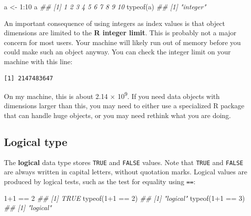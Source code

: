 \documentclass[
  13,
  letterpaper,
]{report}
\newenvironment{Shaded}{\begin{snugshade}}{\end{snugshade}}
\newcommand{\DecValTok}[1]{\textcolor[rgb]{0.68,0.00,0.00}{#1}}
\newcommand{\DocumentationTok}[1]{\textcolor[rgb]{0.37,0.37,0.37}{\textit{#1}}}
\newcommand{\FunctionTok}[1]{\textcolor[rgb]{0.28,0.35,0.67}{#1}}
\newcommand{\NormalTok}[1]{\textcolor[rgb]{0.00,0.23,0.31}{#1}}
\newcommand{\OtherTok}[1]{\textcolor[rgb]{0.00,0.23,0.31}{#1}}
\newcommand{\SpecialCharTok}[1]{\textcolor[rgb]{0.37,0.37,0.37}{#1}}
\begin{document}
\begin{Shaded}
\begin{Highlighting}[]
\NormalTok{a }\OtherTok{\textless{}{-}} \DecValTok{1}\SpecialCharTok{:}\DecValTok{10}
\NormalTok{a}
\DocumentationTok{\#\#  [1]  1  2  3  4  5  6  7  8  9 10}
\FunctionTok{typeof}\NormalTok{(a)}
\DocumentationTok{\#\# [1] "integer"}
\end{Highlighting}
\end{Shaded}

An important consequence of using integers as index values is that
object dimensions are limited to the \textbf{R integer limit}. This is
probably not a major concern for most users. Your machine will likely
run out of memory before you could make such an object anyway. You can
check the integer limit on your machine with this line:

\begin{Shaded}
\end{Shaded}

\begin{verbatim}
[1] 2147483647
\end{verbatim}

On my machine, this is about 2.14 × 10\textsuperscript{9}. If you need
data objects with dimensions larger than this, you may need to either
use a specialized R package that can handle huge objects, or you may
need rethink what you are doing.

\subsection{Logical type}\label{logical-type}

The \textbf{logical} data type stores \texttt{TRUE} and \texttt{FALSE}
values. Note that \texttt{TRUE} and \texttt{FALSE} are always written in
capital letters, without quotation marks. Logical values are produced by
logical tests, such as the test for equality using \texttt{==}:

\begin{Shaded}
\begin{Highlighting}[]
\DecValTok{1}\SpecialCharTok{+}\DecValTok{1} \SpecialCharTok{==} \DecValTok{2}            
\DocumentationTok{\#\# [1] TRUE}
\FunctionTok{typeof}\NormalTok{(}\DecValTok{1}\SpecialCharTok{+}\DecValTok{1} \SpecialCharTok{==} \DecValTok{2}\NormalTok{)    }
\DocumentationTok{\#\# [1] "logical"}
\FunctionTok{typeof}\NormalTok{(}\DecValTok{1}\SpecialCharTok{+}\DecValTok{1} \SpecialCharTok{==} \DecValTok{3}\NormalTok{)    }
\DocumentationTok{\#\# [1] "logical"}
\end{Highlighting}
\end{Shaded}
\end{document}
